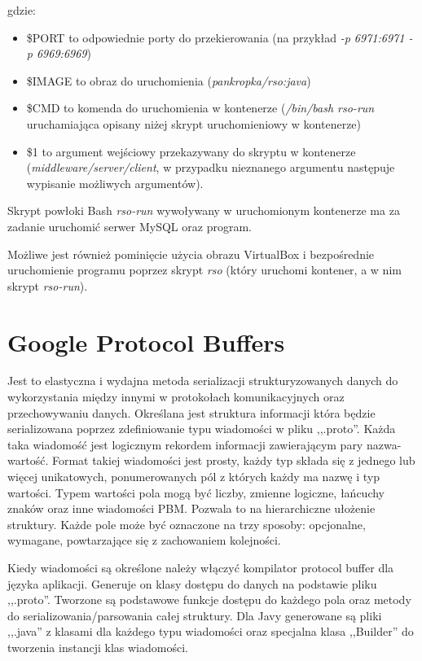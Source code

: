 \par{gdzie: }
\begin{itemize}
\item \$PORT to odpowiednie porty do przekierowania (na przykład \textit{-p 6971:6971 -p 6969:6969})
\item \$IMAGE to obraz do uruchomienia (\textit{pankropka/rso:java})
\item \$CMD to komenda do uruchomienia w kontenerze (\textit{/bin/bash rso-run} uruchamiająca opisany niżej skrypt uruchomieniowy w kontenerze)
\item \$1 to argument wejściowy przekazywany do skryptu w kontenerze (\textit{middleware/server/client}, w przypadku nieznanego argumentu następuje wypisanie możliwych argumentów).
\end{itemize}


\par{Skrypt powłoki Bash \textit{rso-run} wywoływany w uruchomionym kontenerze ma za zadanie uruchomić serwer MySQL oraz program. }

\par{Możliwe jest również pominięcie użycia obrazu VirtualBox i bezpośrednie uruchomienie programu poprzez skrypt \textit{rso} (który uruchomi kontener, a w nim skrypt \textit{rso-run}).}


\section[Google Protocol Buffers]{Google Protocol Buffers} \label{protobuf}

\par{Jest to elastyczna i wydajna metoda serializacji strukturyzowanych danych do wykorzystania między innymi w protokołach komunikacyjnych oraz przechowywaniu danych. Określana jest struktura informacji która będzie serializowana poprzez zdefiniowanie typu wiadomości w pliku ,,.proto''. Każda taka wiadomość jest logicznym rekordem informacji zawierającym pary nazwa-wartość. Format takiej wiadomości jest prosty, każdy typ składa się z jednego lub więcej unikatowych, ponumerowanych pól z których każdy ma nazwę i typ wartości. Typem wartości pola mogą być liczby, zmienne logiczne, łańcuchy znaków oraz inne wiadomości PBM. Pozwala to na hierarchiczne ułożenie struktury. Każde pole może być oznaczone na trzy sposoby: opcjonalne, wymagane, powtarzające się z zachowaniem kolejności.}

\par{Kiedy wiadomości są określone należy włączyć kompilator protocol buffer dla języka aplikacji. Generuje on klasy dostępu do danych na podstawie pliku ,,.proto''. Tworzone są podstawowe funkcje dostępu do każdego pola oraz metody do serializowania/parsowania całej struktury. Dla Javy generowane są pliki ,,.java'' z klasami dla każdego typu wiadomości oraz specjalna klasa ,,Builder'' do tworzenia instancji klas wiadomości.}

